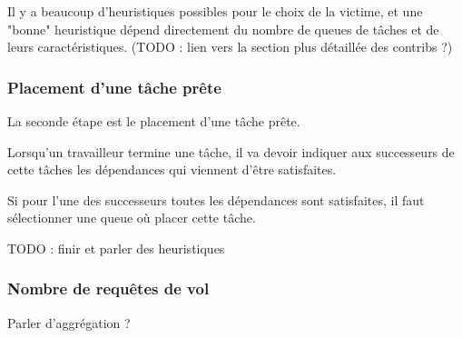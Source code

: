 Il y a beaucoup d'heuristiques possibles pour le choix de la victime, et une "bonne" heuristique dépend directement du nombre de queues de tâches et de leurs caractéristiques.
(TODO : lien vers la section plus détaillée des contribs ?)

\subsubsection{Placement d'une tâche prête}

La seconde étape est le placement d'une tâche prête.

Lorsqu'un travailleur termine une tâche, il va devoir indiquer aux successeurs de cette tâches les dépendances qui viennent d'être satisfaites.

Si pour l'une des successeurs toutes les dépendances sont satisfaites, il faut sélectionner une queue où placer cette tâche.

TODO : finir et parler des heuristiques

\subsubsection{Nombre de requêtes de vol}

Parler d'aggrégation ?


